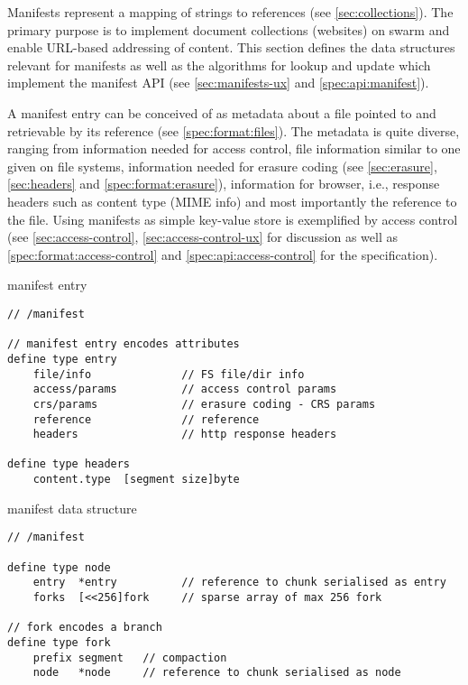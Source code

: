 Manifests represent a mapping of strings to references (see \ref{sec:collections}). The primary purpose is to implement document collections (websites) on swarm and enable URL-based addressing of content. This section defines the data structures relevant for manifests as well as the algorithms for lookup and update which implement the manifest API (see \ref{sec:manifests-ux} and \ref{spec:api:manifest}).

A manifest entry can be conceived of as metadata about a file pointed to and retrievable by its reference (see \ref{spec:format:files}). The metadata is quite diverse, ranging from information needed for access control, file information similar to one given on file systems, information needed for erasure coding (see \ref{sec:erasure}, \ref{sec:headers} and \ref{spec:format:erasure}), information for browser, i.e.,  response headers such as content type (MIME info) and most importantly the reference to the file. Using manifests as simple key-value store is exemplified by access control (see \ref{sec:access-control}, \ref{sec:access-control-ux} for discussion as well as \ref{spec:format:access-control} and \ref{spec:api:access-control} for the specification).

\begin{definition}{manifest entry}\label{def:manifest-entry}
\begin{lstlisting}[language=buzz1]
// /manifest

// manifest entry encodes attributes 
define type entry 
    file/info              // FS file/dir info
    access/params          // access control params
    crs/params             // erasure coding - CRS params
    reference              // reference
    headers                // http response headers 

define type headers
    content.type  [segment size]byte

\end{lstlisting}
\end{definition}

\begin{definition}{manifest data structure}\label{def:manifests}
\begin{lstlisting}[language=buzz1]
// /manifest

define type node 
    entry  *entry          // reference to chunk serialised as entry
    forks  [<<256]fork     // sparse array of max 256 fork

// fork encodes a branch
define type fork 
    prefix segment   // compaction 
    node   *node     // reference to chunk serialised as node

\end{lstlisting}
\end{definition}

